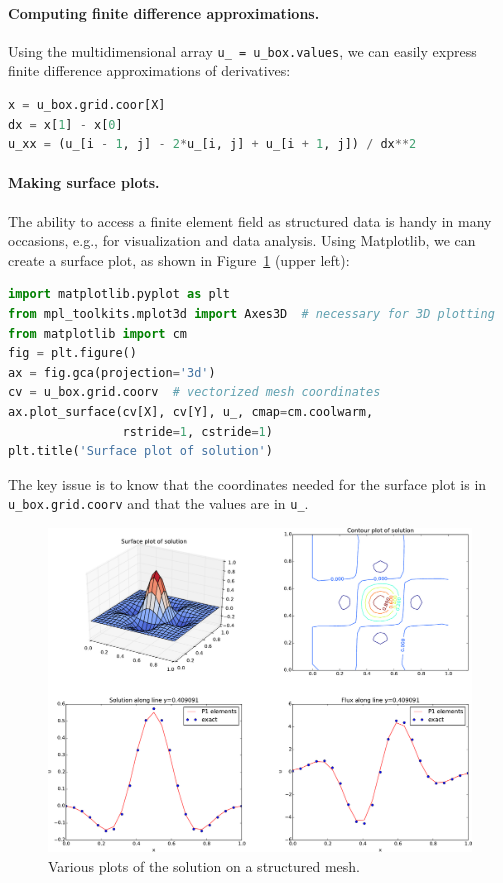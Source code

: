 \documentclass[graybox,envcountchap,sectrefs,final]{svmonodo}
\begin{document}
\paragraph{Computing finite difference approximations.}
Using the multidimensional array \Verb!u_ = u_box.values!, we can easily
express finite difference approximations of derivatives:

\begin{lstlisting}[language=Python,style=graycolor]
x = u_box.grid.coor[X]
dx = x[1] - x[0]
u_xx = (u_[i - 1, j] - 2*u_[i, j] + u_[i + 1, j]) / dx**2
\end{lstlisting}


\paragraph{Making surface plots.}
The ability to access a finite element field as structured data
is handy in many occasions, e.g., for visualization and data analysis.
Using Matplotlib, we can create a surface plot, as shown in
Figure~\ref{ftut:structviz:fig1} (upper left):

\begin{lstlisting}[language=Python,style=graycolor]
import matplotlib.pyplot as plt
from mpl_toolkits.mplot3d import Axes3D  # necessary for 3D plotting
from matplotlib import cm
fig = plt.figure()
ax = fig.gca(projection='3d')
cv = u_box.grid.coorv  # vectorized mesh coordinates
ax.plot_surface(cv[X], cv[Y], u_, cmap=cm.coolwarm,
                rstride=1, cstride=1)
plt.title('Surface plot of solution')
\end{lstlisting}
The key issue is to know that the coordinates needed for the surface
plot is in \Verb!u_box.grid.coorv! and that the values are in \Verb!u_!.


\begin{figure}[!ht]  %
  \centerline{\includegraphics[width=0.95\linewidth]{fig/poisson_extended.pdf}}
  \caption{
  Various plots of the solution on a structured mesh. \label{ftut:structviz:fig1}
  }
\end{figure}
\end{document}
